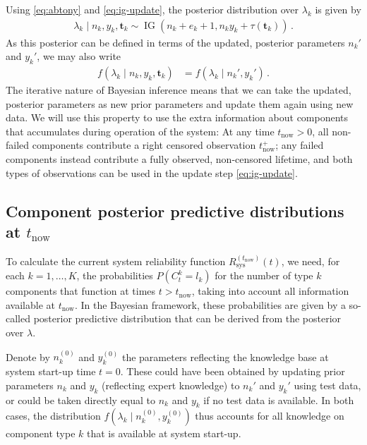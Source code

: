 \documentclass[authoryear]{elsarticle}
\renewcommand{\vec}[1]{{\bm#1}}
\newcommand{\uz}{^{(0)}} %
\newcommand{\ig}{\operatorname{IG}}   %
\def\ykz{y\uz_k}
\def\nkz{n\uz_k}
\newcommand{\nk}{n_k}
\newcommand{\nkp}{n_k'}
\newcommand{\yk}{y_k}
\newcommand{\ykp}{y_k'}
\def\tautk{\tau(\vec{t}_k)}
\def\tnow{t_\text{now}}
\def\tpnow{t^+_\text{now}}
\newcommand{\Rsysnow}{R^{(t_\text{now})}_\text{sys}}
\begin{document}
Using \eqref{eq:abtony} and \eqref{eq:ig-update}, the posterior distribution over $\lambda_k$ is given by
\begin{align}
\lambda_k \mid \nk, \yk, \vec{t}_k \sim \ig(\nk + e_k + 1, \nk \yk + \tautk)\,.
\label{eq:ig-update-alpha}
\end{align}
As this posterior can be defined in terms of
the updated, posterior parameters $\nkp$ and $\ykp$,
we may also write
\begin{align*}
f(\lambda_k \mid \nk, \yk, \vec{t}_k) &= f(\lambda_k \mid \nkp, \ykp)\,.
\end{align*}
The iterative nature of Bayesian inference means that we can take the updated,
posterior parameters as new prior parameters and update them again using new data.
We will use this property to use the extra information about components
that accumulates during operation of the system:
At any time $\tnow > 0$,
all non-failed components contribute a right censored observation $\tpnow$;
any failed components instead contribute a fully observed, non-censored lifetime,
and both types of observations can be used in the update step \eqref{eq:ig-update}.



\subsection{Component posterior predictive distributions at $\tnow$}
\label{sec:postpred}

To calculate the current system reliability function $\Rsysnow(t)$,
we need, for each $k=1,\ldots, K$, the probabilities $P(C^k_t = l_k)$
for the number of type $k$ components that function at times $t > \tnow$,
taking into account all information available at $\tnow$.
In the Bayesian framework, these probabilities are given
by a so-called posterior predictive distribution that can be derived from the posterior over $\lambda$.

Denote by $\nkz$ and $\ykz$ the parameters reflecting the knowledge base at system start-up time $t=0$.
These could have been obtained by updating prior parameters $\nk$ and $\yk$ (reflecting expert knowledge)
to $\nkp$ and $\ykp$ using test data,
or could be taken directly equal to $\nk$ and $\yk$ if no test data is available.
In both cases, the distribution $f(\lambda_k \mid \nkz, \ykz)$
thus accounts for all knowledge on component type $k$ that is available at system start-up.
\end{document}
